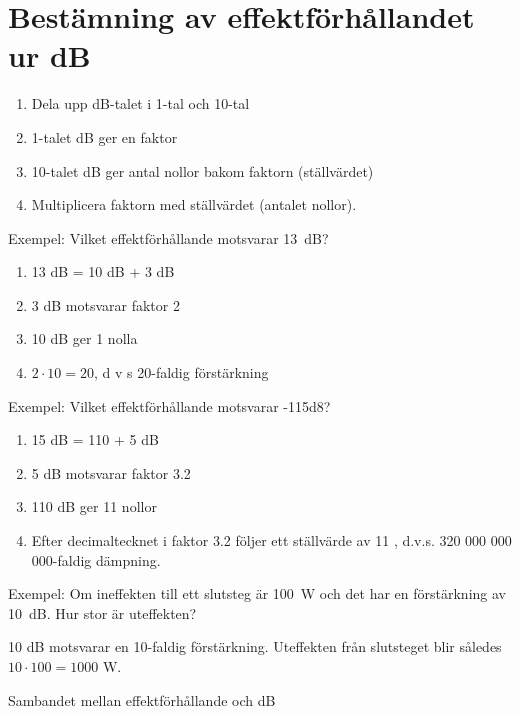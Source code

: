 \section{Bestämning av effektförhållandet ur dB}

\begin{rev-raderas}

\begin{enumerate}
\item Dela upp dB-talet i 1-tal och 10-tal
\item 1-talet dB ger en faktor
\item 10-talet dB ger antal nollor bakom faktorn (ställvärdet)
\item Multiplicera faktorn med ställvärdet (antalet nollor).
\end{enumerate}

Exempel: Vilket effektförhållande motsvarar 13~dB?

\begin{enumerate}
\item 13 dB = 10 dB + 3 dB
\item 3 dB motsvarar faktor 2
\item 10 dB ger 1 nolla
\item \(2 \cdot 10 = 20\), d v s 20-faldig förstärkning
\end{enumerate}

Exempel: Vilket effektförhållande motsvarar -115d8?
\begin{enumerate}
\item 15 dB = 110 + 5 dB
\item 5 dB motsvarar faktor 3.2
\item 110 dB ger 11 nollor
\item Efter decimaltecknet i faktor 3.2 följer ett ställvärde av 11 ,
  d.v.s. 320 000 000 000-faldig dämpning.
\end{enumerate}

Exempel: Om ineffekten till ett slutsteg är 100~W och det har en
förstärkning av 10~dB.  Hur stor är uteffekten?

10 dB motsvarar en 10-faldig förstärkning.  Uteffekten från slutsteget
blir således \(10 \cdot 100 = 1000\) W.

Sambandet mellan effektförhållande och dB


\end{rev-raderas}
